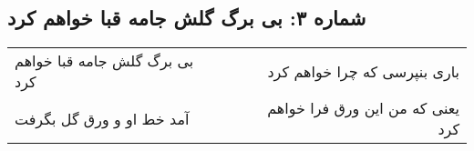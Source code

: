 \begin{center}
\section*{شماره ۳: بی برگ گلش جامه قبا خواهم کرد}
\label{sec:003}
\begin{longtable}{l p{0.5cm} r}
بی برگ گلش جامه قبا خواهم کرد
&&
باری بنپرسی که چرا خواهم کرد
\\
آمد خط او و ورق گل بگرفت
&&
یعنی که من این ورق فرا خواهم کرد
\\
\end{longtable}
\end{center}
